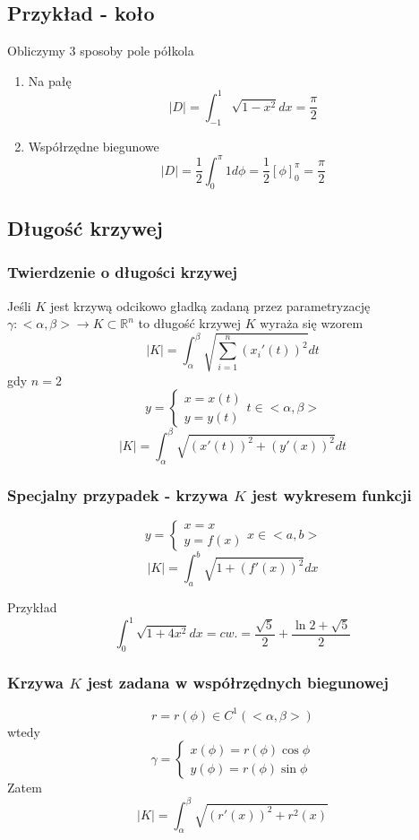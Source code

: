 \documentclass[11pt]{article}
\begin{document}
\subsection{Przykład - koło}
Obliczymy 3 sposoby pole półkola
\begin{enumerate}
\item{Na pałę}
$$|D| = \int_{-1}^1 \sqrt{1-x^2}dx = \frac{\pi}{2}$$
\item{Współrzędne biegunowe}
$$|D| = \frac{1}{2}\int_0^\pi 1 d\phi = \frac{1}{2} \left[\phi \right]_0^\pi = \frac{\pi}{2}$$
\end{enumerate}
\subsection{Długość krzywej}
\subsubsection{Twierdzenie o długości krzywej}
Jeśli $K$ jest krzywą odcikowo gładką zadaną przez parametryzację $ \gamma : <\alpha,\beta> \to K \subset \mathbb{R}^n $ to długość krzywej $K$ wyraża się wzorem
$$ |K| = \int_\alpha^\beta \sqrt{ \sum_{i=1}^{n}(x_i'(t))^2}dt $$
gdy $n=2$
$$ y = \begin{cases} x = x(t) \\ y = y(t) \end{cases}
t \in <\alpha,\beta> $$
$$ |K| = \int_\alpha^\beta \sqrt{(x'(t))^2 + (y'(x))^2}dt $$
\subsubsection{Specjalny przypadek - krzywa $K$ jest wykresem funkcji}
$$ y  = \begin{cases} x = x \\ y = f(x) \end{cases} x \in <a,b> $$
$$ | K | = \int_a^b \sqrt{1+(f'(x))^2}dx $$

Przykład
$$\int_0^1 \sqrt{1 +4x^2}dx = cw. = \frac{\sqrt{5}}{2} + \frac{\ln{2+\sqrt{5}}}{2}$$
\subsubsection{Krzywa $K$ jest zadana w współrzędnych biegunowej}
$$ r = r(\phi) \in C^1(<\alpha,\beta>) $$ wtedy
$$ \gamma = \begin{cases} x(\phi)  = r(\phi) \cos{\phi} \\ y(\phi) = r(\phi) \sin{\phi} \end{cases} $$
Zatem
$$ |K| = \int_\alpha^\beta \sqrt{(r'(x))^2 + r^2(x)} $$
\end{document}
